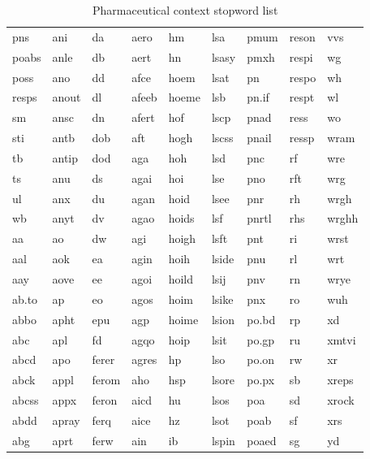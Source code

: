 \begin{table}[]
\setlength{\tabcolsep}{8pt}
\centering
\caption{Pharmaceutical context stopword list}
\label{table:app-contractions}
\begin{tabular}{@{}lllllllll@{}}
pns   & ani   & da    & aero  & hm    & lsa   & pmum  & reson & vvs   \\
poabs & anle  & db    & aert  & hn    & lsasy & pmxh  & respi & wg    \\
poss  & ano   & dd    & afce  & hoem  & lsat  & pn    & respo & wh    \\
resps & anout & dl    & afeeb & hoeme & lsb   & pn.if & respt & wl    \\
sm    & ansc  & dn    & afert & hof   & lscp  & pnad  & ress  & wo    \\
sti   & antb  & dob   & aft   & hogh  & lscss & pnail & ressp & wram  \\
tb    & antip & dod   & aga   & hoh   & lsd   & pnc   & rf    & wre   \\
ts    & anu   & ds    & agai  & hoi   & lse   & pno   & rft   & wrg   \\
ul    & anx   & du    & agan  & hoid  & lsee  & pnr   & rh    & wrgh  \\
wb    & anyt  & dv    & agao  & hoids & lsf   & pnrtl & rhs   & wrghh \\
aa    & ao    & dw    & agi   & hoigh & lsft  & pnt   & ri    & wrst  \\
aal   & aok   & ea    & agin  & hoih  & lside & pnu   & rl    & wrt   \\
aay   & aove  & ee    & agoi  & hoild & lsij  & pnv   & rn    & wrye  \\
ab.to & ap    & eo    & agos  & hoim  & lsike & pnx   & ro    & wuh   \\
abbo  & apht  & epu   & agp   & hoime & lsion & po.bd & rp    & xd    \\
abc   & apl   & fd    & agqo  & hoip  & lsit  & po.gp & ru    & xmtvi \\
abcd  & apo   & ferer & agres & hp    & lso   & po.on & rw    & xr    \\
abck  & appl  & ferom & aho   & hsp   & lsore & po.px & sb    & xreps \\
abcss & appx  & feron & aicd  & hu    & lsos  & poa   & sd    & xrock \\
abdd  & apray & ferq  & aice  & hz    & lsot  & poab  & sf    & xrs   \\
abg   & aprt  & ferw  & ain   & ib    & lspin & poaed & sg    & yd    \\

\end{tabular}
\end{table}
